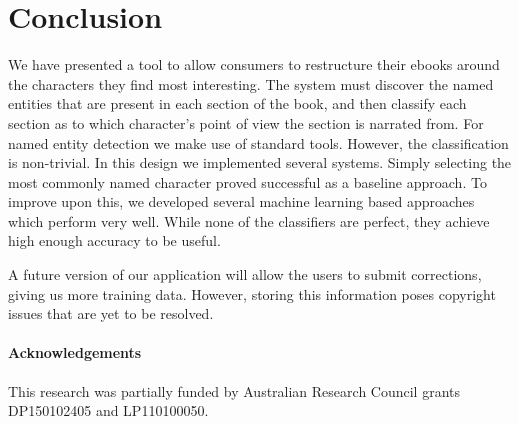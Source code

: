 \documentclass[11pt,a4paper]{article}
\begin{document}
\section{Conclusion}\label{sec:conclusion}
We have presented a tool to allow consumers to restructure their ebooks around the characters they find most interesting.
The system must discover the named entities that are present in each section of the book,
and then classify each section as to which character's point of view the section is narrated from.
For named entity detection we make use of standard tools.
However, the classification is non-trivial.
In this design we implemented several systems.
Simply selecting the most commonly named character proved successful as a baseline approach.
To improve upon this, we developed several machine learning based approaches which perform very well.
While none of the classifiers are perfect, they achieve high enough accuracy to be useful.

A future version of our application will allow the users to submit corrections, giving us more training data.
However, storing this information poses copyright issues that are yet to be resolved.

\paragraph{Acknowledgements}
This research was partially funded by Australian Research Council grants DP150102405 and LP110100050.


\end{document}
